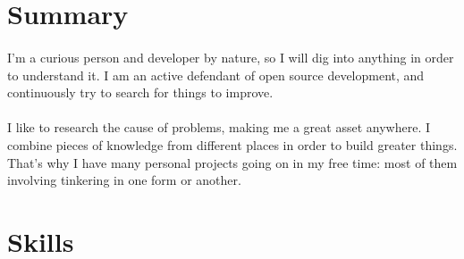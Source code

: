 \documentclass{curriculum}
\author{Rolf Vidar {\bfseries Mazunki} Hoksaas}
\date{}
\begin{document}
	\maketitle

	\section{Summary}
	\paragraph{} I'm a curious person and developer by nature, so I will dig into anything in order to understand it. I am an active defendant of open source development, and continuously try to search for things to improve. 
	\paragraph{} I like to research the cause of problems, making me a great asset anywhere. I combine pieces of knowledge from different places in order to build greater things. That's why I have many personal projects going on in my free time: most of them involving tinkering in one form or another.

	\section{Skills}
\end{document}
